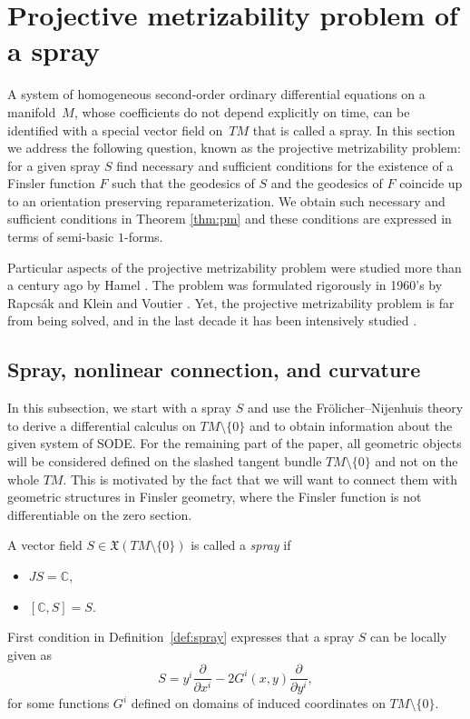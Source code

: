 \section{Projective metrizability problem of a spray}
\label{sec:pms}

A system of homogeneous second-order ordinary dif\/ferential equations
on a manifold~$M$, whose coef\/f\/icients do not depend explicitly on time, can be identif\/ied
with a special vector f\/ield on~$TM$ that is called a spray. In
this section we address the following question, known as the
projective metrizability problem: for a given spray $S$ f\/ind necessary
and suf\/f\/icient conditions for the existence of a Finsler function $F$
such that the geodesics of $S$ and the geodesics of $F$ coincide up to
an orientation preserving reparameterization. We obtain such necessary and
suf\/f\/icient conditions in Theorem \ref{thm:pm} and these conditions are expressed
in terms of semi-basic $1$-forms.

Particular aspects of the projective metrizability problem were studied more than a century ago by Hamel
\cite{hamel03}. The problem was formulated rigorously in 1960's by Rapcs\'ak
\cite{rapcsak62} and Klein and Voutier \cite{klein68}. Yet, the projective
metrizability problem is far from being solved, and in the last decade
it has been intensively studied \cite{paiva05, bucataru09,
  crampin07b, crampin08,  shen01, szilasi07,  szilasi02, yang11}.


\subsection{Spray, nonlinear connection, and curvature}
\label{subsec:sn}

In this subsection, we start with a spray $S$ and use the Fr\"olicher--Nijenhuis theory
to derive a dif\/ferential calculus on $TM\setminus\{0\}$ \cite{grifone72} and to
obtain information about the given system of SODE. For the remaining
part of the paper, all geometric objects will be considered def\/ined on
the slashed tangent bundle $TM\setminus\{0\}$ and not on the whole
$TM$. This is motivated by the fact that we will want to connect them
with geometric structures in Finsler geometry, where the Finsler
function is not dif\/ferentiable on the zero section.

\begin{Definition} \label{def:spray} A vector f\/ield $S\in{\mathfrak X}(TM\setminus\{0\})$
is called a \emph{spray} if
\begin{itemize}\itemsep=0pt
\item[i)] $JS=\mathbb{C}$,
\item[ii)] $[\mathbb{C}, S]=S$. \end{itemize}
\end{Definition}
First condition in Def\/inition~\ref{def:spray} expresses that a
spray $S$ can be locally given as
\[
 S=y^i\frac{\partial}{\partial x^i} - 2G^i(x,y) \frac{\partial}{\partial   y^i},
  \]
   for some functions $G^i$ def\/ined on domains of induced
coordinates on $TM\setminus\{0\}$.


